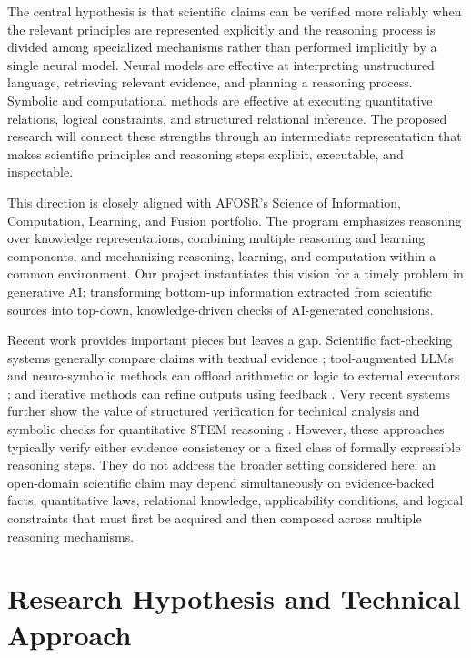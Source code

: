 \documentclass[12pt]{article}
\begin{document}
The central hypothesis is that scientific claims can be verified more reliably when the relevant principles are represented explicitly and the reasoning process is divided among specialized mechanisms rather than performed implicitly by a single neural model. Neural models are effective at interpreting unstructured language, retrieving relevant evidence, and planning a reasoning process. Symbolic and computational methods are effective at executing quantitative relations, logical constraints, and structured relational inference. The proposed research will connect these strengths through an intermediate representation that makes scientific principles and reasoning steps explicit, executable, and inspectable.

This direction is closely aligned with AFOSR's Science of Information, Computation, Learning, and Fusion portfolio. The program emphasizes reasoning over knowledge representations, combining multiple reasoning and learning components, and mechanizing reasoning, learning, and computation within a common environment. Our project instantiates this vision for a timely problem in generative AI: transforming bottom-up information extracted from scientific sources into top-down, knowledge-driven checks of AI-generated conclusions.

Recent work provides important pieces but leaves a gap. Scientific fact-checking systems generally compare claims with textual evidence \citep{wadden2020scifact}; tool-augmented LLMs and neuro-symbolic methods can offload arithmetic or logic to external executors \citep{schick2023toolformer,pan2023logiclm}; and iterative methods can refine outputs using feedback \citep{madaan2023selfrefine}. Very recent systems further show the value of structured verification for technical analysis \citep{du2026autoverifier} and symbolic checks for quantitative STEM reasoning \citep{zi2026nsprm}. However, these approaches typically verify either evidence consistency or a fixed class of formally expressible reasoning steps. They do not address the broader setting considered here: an open-domain scientific claim may depend simultaneously on evidence-backed facts, quantitative laws, relational knowledge, applicability conditions, and logical constraints that must first be acquired and then composed across multiple reasoning mechanisms.

\section*{Research Hypothesis and Technical Approach}
\end{document}
